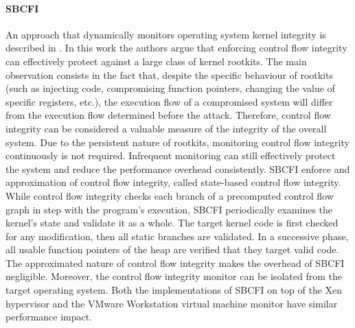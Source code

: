\paragraph{SBCFI}
An approach that dynamically monitors operating system kernel integrity is described in \cite{SBCFI}. In this work the authors argue that enforcing control flow integrity can effectively protect against a large class of kernel rootkits. The main observation consists in the fact that, despite the specific behaviour of rootkits (such as injecting code, compromising function pointers, changing the value of specific registers, etc.), the execution flow of a compromised system will differ from the execution flow determined before the attack.
Therefore, control flow integrity can be considered a valuable measure of the integrity of the overall system.
Due to the persistent nature of rootkits, monitoring control flow integrity continuously is not required. Infrequent monitoring can still effectively protect the system and reduce the performance overhead consistently.
SBCFI enforce and approximation of control flow integrity, called state-based control flow integrity. While control flow integrity checks each branch of a precomputed control flow graph in step with the program's execution, SBCFI periodically examines the kernel's state and validate it as a whole.
The target kernel code is first checked for any modification, then all static branches are validated. In a successive phase, all usable function pointers of the heap are verified that they target valid code.
The approximated nature of control flow integrity makes the overhead of SBCFI negligible. Moreover, the control flow integrity monitor can be isolated from the target operating system. 
Both the implementations of SBCFI on top of the Xen hypervisor and the VMware Workstation virtual machine monitor have similar performance impact.




